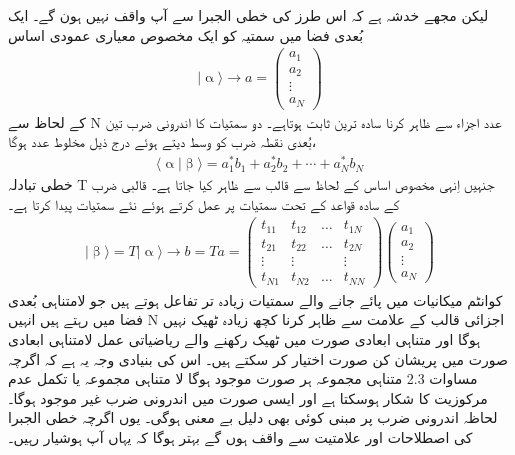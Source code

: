 	لیکن مجھے خدشہ ہے کہ اس طرز کی خطی الجبرا سے آپ واقف نہیں ہون گے۔ ایک بُعدی فضا میں سمتیہ  کو ایک مخصوص معیاری عمودی اساس
	\begin{align}
		|\upalpha \rangle \rightarrow a = \begin{pmatrix} 
			a_{1}\\
			a_{2}\\
			\vdots\\
			a_{N}
		 \end{pmatrix}
	\end{align}
کے لحاظ سے N عدد اجزاء  
 سے ظاہر کرنا سادہ ترین ثابت ہوتاہے۔ دو سمتیات کا اندرونی ضرب   تین بُعدی نقطہ ضرب کو وسط دیتے ہوئے درج ذیل مخلوط عدد ہوگا،
\begin{align}
	\langle \upalpha | \upbeta \rangle =a_1^{\ast}b_1 + a_2^{\ast}b_2 + \dotsb +a_N^{\ast}b_N
\end{align}
خطی تبادلہ T جنہیں اِنہی مخصوص اساس کے لحاظ سے قالب سے ظاہر کیا جاتا ہے۔ قالبی ضرب کے سادہ قواعد کے تحت سمتیات پر عمل کرتے ہوئے نئے سمتیات پیدا کرتا ہے۔
\begin{align}
	|\upbeta \rangle = T|\upalpha \rangle \rightarrow b = Ta = \begin{pmatrix}
		t_{11} & t_{12} & \hdots & t_{1N} \\ 
		t_{21} & t_{22} & \hdots & t_{2N} \\
		\vdots & \vdots &        & \vdots \\
		t_{N1} & t_{N2} & \hdots & t_{NN} 
	\end{pmatrix}
\begin{pmatrix}
	a_{1}\\
	a_{2}\\
	\vdots\\
	a_{N}
\end{pmatrix}
\end{align}
کوانٹم میکانیات میں پائے جانے والے سمتیات زیادہ تر تفاعل ہوتے ہیں جو لامتناہی بُعدی فضا میں رہتے ہیں انہیں N اجزائی قالب کے علامت سے ظاہر کرنا کچھ زیادہ ٹھیک نہیں ہوگا اور متناہی ابعادی صورت میں ٹھیک رکھنے والے ریاضیاتی عمل لامتناہی ابعادی صورت  میں پریشان کن صورت اختیار کر سکتے ہیں۔ اس کی بنیادی وجہ یہ ہے کہ اگرچہ  مساوات 2.3 متناہی مجموعہ ہر صورت موجود ہوگا لا متناہی مجموعہ یا تکمل عدم مرکوزیت کا شکار ہوسکتا ہے اور ایسی صورت میں اندرونی ضرب غیر موجود ہوگا۔ لحاظہ اندرونی ضرب پر مبنی کوئی بھی دلیل بے معنی ہوگی۔ یوں اگرچہ خطی الجبرا کی اصطلاحات اور علامتیت سے واقف ہوں گے بہتر ہوگا کہ یہاں آپ ہوشیار رہیں۔

